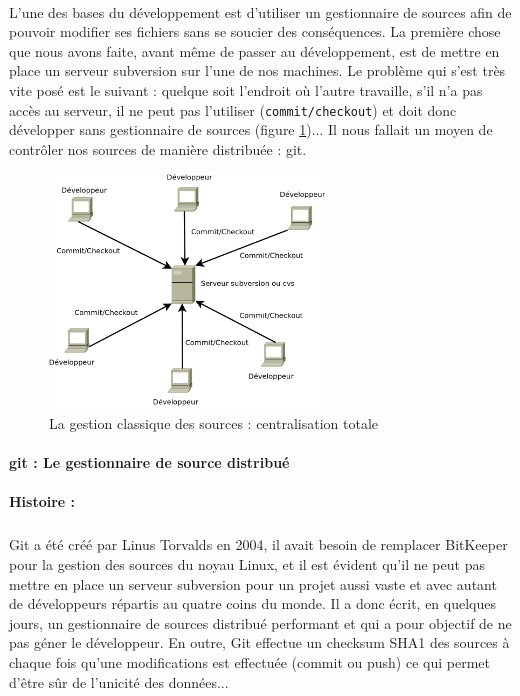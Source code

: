 \paragraph{} L'une des bases du développement est d'utiliser un gestionnaire de sources afin de pouvoir modifier ses fichiers sans se soucier des conséquences. La première chose que nous avons faite, avant même de passer au développement, est de mettre en place un serveur subversion sur l'une de nos machines. Le problème qui s'est très vite posé est le suivant : quelque soit l'endroit où l'autre travaille, s'il n'a pas accès au serveur, il ne peut pas l'utiliser (\verb|commit/checkout|) et doit donc développer sans gestionnaire de sources (figure \ref{svn})... Il nous fallait un moyen de contrôler nos sources de manière distribuée : git.

\begin{figure}[H]
\begin{center}
        \includegraphics[width=0.65\textwidth]{./schema/svn.png}
\caption{La gestion classique des sources : centralisation totale }
\label{svn}
\end{center}
\end{figure}


\paragraph{git : Le gestionnaire de source distribué}
\label{gitPar}
\paragraph{Histoire :}
\subparagraph{} Git a été créé par Linus Torvalds en 2004, il avait besoin de remplacer BitKeeper pour la gestion des sources du noyau Linux, et il est évident qu'il ne peut pas mettre en place un serveur subversion pour un projet aussi vaste et avec autant de développeurs répartis au quatre coins du monde. Il a donc écrit, en quelques jours, un gestionnaire de sources distribué performant et qui a pour objectif de ne pas géner le développeur. En outre, Git effectue un checksum SHA1 des sources à chaque fois qu'une modifications est effectuée (commit ou push) ce qui permet d'être sûr de l'unicité des données...

